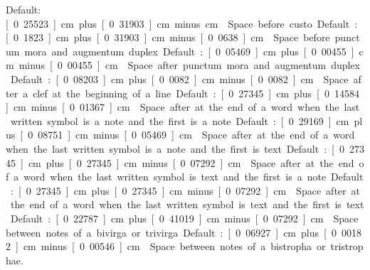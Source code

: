 Default: \unit[0.25523]{cm} plus \unit[0.31903]{cm} minus \unit[0]{cm}

Space before custo.  

Default: \unit[0.1823]{cm} plus \unit[0.31903]{cm} minus \unit[0.0638]{cm}

Space before punctum mora and augmentum duplex.  

Default: \unit[0.05469]{cm} plus \unit[0.00455]{cm} minus \unit[0.00455]{cm}

Space after punctum mora and augmentum duplex.  

Default: \unit[0.08203]{cm} plus \unit[0.0082]{cm} minus \unit[0.0082]{cm}

Space after a clef at the beginning of a line.  

Default: \unit[0.27345]{cm} plus \unit[0.14584]{cm} minus \unit[0.01367]{cm}

Space after at the end of a word when the last written symbol is a note and the first is a note.  

Default: \unit[0.29169]{cm} plus \unit[0.08751]{cm} minus \unit[0.05469]{cm}

Space after at the end of a word when the last written symbol is a note and the first is text.  

Default: \unit[0.27345]{cm} plus \unit[0.27345]{cm} minus \unit[0.07292]{cm}

Space after at the end of a word when the last written symbol is text and the first is a note.  

Default: \unit[0.27345]{cm} plus \unit[0.27345]{cm} minus \unit[0.07292]{cm}

Space after at the end of a word when the last written symbol is text and the first is text.  

Default: \unit[0.22787]{cm} plus \unit[0.41019]{cm} minus \unit[0.07292]{cm}

Space between notes of a bivirga or trivirga.  

Default: \unit[0.06927]{cm} plus \unit[0.00182]{cm} minus \unit[0.00546]{cm}

Space between notes of a bistropha or tristrophae.  


